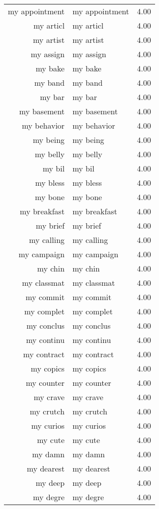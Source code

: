 \begin{table}[ht]
\begin{tabular}{rlr}
  my appointment & my appointment & 4.00 \\ 
  my articl & my articl & 4.00 \\ 
  my artist & my artist & 4.00 \\ 
  my assign & my assign & 4.00 \\ 
  my bake & my bake & 4.00 \\ 
  my band & my band & 4.00 \\ 
  my bar & my bar & 4.00 \\ 
  my basement & my basement & 4.00 \\ 
  my behavior & my behavior & 4.00 \\ 
  my being & my being & 4.00 \\ 
  my belly & my belly & 4.00 \\ 
  my bil & my bil & 4.00 \\ 
  my bless & my bless & 4.00 \\ 
  my bone & my bone & 4.00 \\ 
  my breakfast & my breakfast & 4.00 \\ 
  my brief & my brief & 4.00 \\ 
  my calling & my calling & 4.00 \\ 
  my campaign & my campaign & 4.00 \\ 
  my chin & my chin & 4.00 \\ 
  my classmat & my classmat & 4.00 \\ 
  my commit & my commit & 4.00 \\ 
  my complet & my complet & 4.00 \\ 
  my conclus & my conclus & 4.00 \\ 
  my continu & my continu & 4.00 \\ 
  my contract & my contract & 4.00 \\ 
  my copics & my copics & 4.00 \\ 
  my counter & my counter & 4.00 \\ 
  my crave & my crave & 4.00 \\ 
  my crutch & my crutch & 4.00 \\ 
  my curios & my curios & 4.00 \\ 
  my cute & my cute & 4.00 \\ 
  my damn & my damn & 4.00 \\ 
  my dearest & my dearest & 4.00 \\ 
  my deep & my deep & 4.00 \\ 
  my degre & my degre & 4.00 \\ 

\end{tabular}
\end{table}
